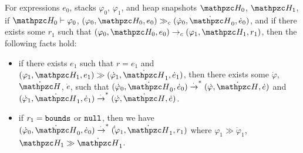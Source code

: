 \begin{thm}\label{simulation-thm}
For \lang expressions $e_0$, stacks $\varphi_0$, $\varphi_1$, and heap snapshots $\heap_0$, $\heap_1$, 
if $\heap_0 \vdash \varphi_0$, $(\varphi_0,\heap_0,e_0)\gg_c (\dot \varphi_0,\dot \heap_0, \dot e_0)$,
and if there exists some $r_1$ such that $(\varphi_0, \heap_0, e_0)
\rightarrow_c (\varphi_1, \heap_1, r_1)$, then the following facts hold:

\begin{itemize}

\item if there exists $e_1$ such that $r=e_1$ and $(\varphi_1, \heap_1, e_1) \gg (\dot \varphi_1, \dot \heap_1, \dot e_1)$, then there exists some $\dot \varphi$,$\dot \heap$, $\dot e$, such that
$(\dot \varphi_0, \dot \heap_0,\dot e_0) \xrightarrow{\cdot}^* (\dot
\varphi,\dot \heap,\dot e)$ and $(\dot
\varphi_1,\dot \heap_1,\dot e_1) \xrightarrow{\cdot}^* (\dot \varphi,
\dot \heap,\dot e)$.

\item if $r_1 = \mathtt{bounds}$ or $\mathtt{null}$, then we have $(\dot \varphi_0, \dot \heap_0,\dot e_0) \xrightarrow{\cdot}^* (\dot
\dot \varphi_1,\dot \heap_1, r_1)$ where $\varphi_1 \gg \dot
\varphi_1$, $\heap_1 \gg \dot \heap_1$.

\end{itemize}
\end{thm}



